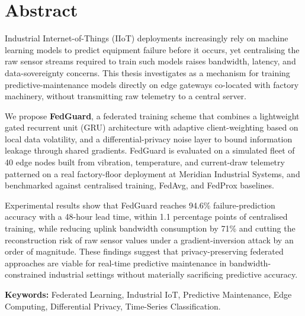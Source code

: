 \chapter*{Abstract}
\thispagestyle{plain}

Industrial Internet-of-Things (IIoT) deployments increasingly rely on machine learning
models to predict equipment failure before it occurs, yet centralising the raw sensor
streams required to train such models raises bandwidth, latency, and data-sovereignty
concerns. This thesis investigates  as a mechanism for
training predictive-maintenance models directly on edge gateways co-located with factory
machinery, without transmitting raw telemetry to a central server.

We propose \textbf{FedGuard}, a federated training scheme that combines a lightweight
gated recurrent unit (GRU) architecture with adaptive client-weighting based on local
data volatility, and a differential-privacy noise layer to bound information leakage
through shared gradients. FedGuard is evaluated on a simulated fleet of 40 edge nodes
built from vibration, temperature, and current-draw telemetry patterned on a real
factory-floor deployment at Meridian Industrial Systems, and benchmarked against
centralised training, FedAvg, and FedProx baselines.

Experimental results show that FedGuard reaches 94.6\% failure-prediction accuracy with
a 48-hour lead time, within 1.1 percentage points of centralised training, while reducing
uplink bandwidth consumption by 71\% and cutting the reconstruction risk of raw sensor
values under a gradient-inversion attack by an order of magnitude. These findings suggest
that privacy-preserving federated approaches are viable for real-time predictive
maintenance in bandwidth-constrained industrial settings without materially sacrificing
predictive accuracy.

\vspace{10pt}
\noindent\textbf{Keywords:} Federated Learning, Industrial IoT, Predictive Maintenance,
Edge Computing, Differential Privacy, Time-Series Classification.

\tableofcontents
\listoffigures
\listoftables
